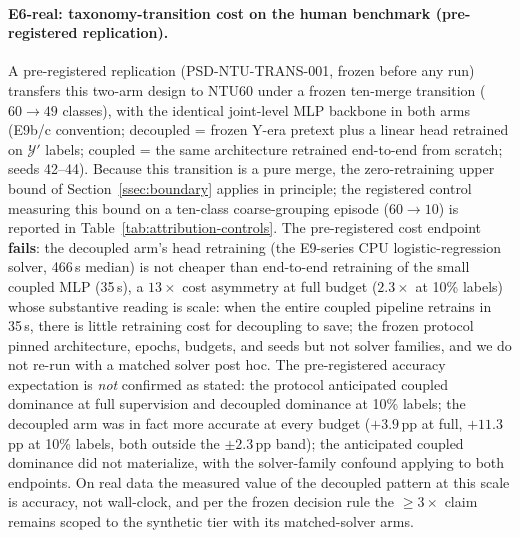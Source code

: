 \paragraph{E6-real: taxonomy-transition cost on the human benchmark (pre-registered replication).}
A pre-registered replication (PSD-NTU-TRANS-001, frozen before any run) transfers this two-arm design to NTU60 under a frozen ten-merge transition ($60\to49$ classes), with the identical joint-level MLP backbone in both arms (E9b/c convention; decoupled = frozen Y-era pretext plus a linear head retrained on $\mathcal{Y}'$ labels; coupled = the same architecture retrained end-to-end from scratch; seeds 42--44). Because this transition is a pure merge, the zero-retraining upper bound of Section~\ref{ssec:boundary} applies in principle; the registered control measuring this bound on a ten-class coarse-grouping episode ($60\to10$) is reported in Table~\ref{tab:attribution-controls}. The pre-registered cost endpoint \textbf{fails}: the decoupled arm's head retraining (the E9-series CPU logistic-regression solver, 466\,s median) is not cheaper than end-to-end retraining of the small coupled MLP (35\,s), a $13\times$ cost asymmetry at full budget ($2.3\times$ at 10\% labels) whose substantive reading is scale: when the entire coupled pipeline retrains in 35\,s, there is little retraining cost for decoupling to save; the frozen protocol pinned architecture, epochs, budgets, and seeds but not solver families, and we do not re-run with a matched solver post hoc. The pre-registered accuracy expectation is \emph{not} confirmed as stated: the protocol anticipated coupled dominance at full supervision and decoupled dominance at 10\% labels; the decoupled arm was in fact more accurate at every budget ($+3.9$\,pp at full, $+11.3$\,pp at 10\% labels, both outside the $\pm2.3$\,pp band); the anticipated coupled dominance did not materialize, with the solver-family confound applying to both endpoints. On real data the measured value of the decoupled pattern at this scale is accuracy, not wall-clock, and per the frozen decision rule the $\geq3\times$ claim remains scoped to the synthetic tier with its matched-solver arms.


